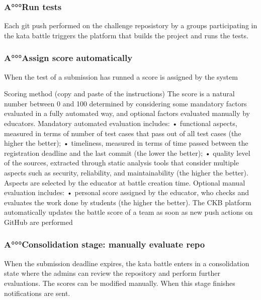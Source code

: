 \documentclass{article}
\newcommand{\admins}{admins }
\newcommand{\group}{groups }
\begin{document}
            \subsubsection{A°°°Run tests}
                Each git push performed on the challenge reposistory by a \group participating in the kata battle triggers the platform that builds the project and runs the tests.

            \subsubsection{A°°°Assign score automatically}
                When the test of a submission has runned a score is assigned by the system

                Scoring method (copy and paste of the instructions)
                The score is a natural number between 0 and 100 determined by considering some mandatory factors evaluated in a fully automated way, and optional factors evaluated manually by educators. Mandatory automated evaluation includes:
                • functional aspects, measured in terms of number of test cases that pass out of all test cases (the
                higher the better);
                • timeliness, measured in terms of time passed between the registration deadline and the last
                commit (the lower the better);
                • quality level of the sources, extracted through static analysis tools that consider multiple aspects
                such as security, reliability, and maintainability (the higher the better). Aspects are selected by the
                educator at battle creation time. Optional manual evaluation includes:
                • personal score assigned by the educator, who checks and evaluates the work done by students (the
                higher the better).
                The CKB platform automatically updates the battle score of a team as soon as new push actions on GitHub are performed
            \subsubsection{A°°°Consolidation stage: manually evaluate repo}
                When the submission deadline expires, the kata battle enters in a consolidation state where the \admins can review the repository and perform further evaluations. The scores can be modified manually. When this stage finishes notifications are sent.
\end{document}
